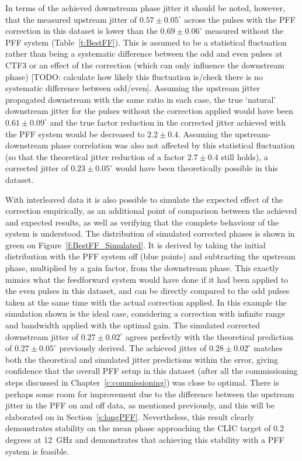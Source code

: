 In terms of the achieved downstream phase jitter it should be noted, however, that the measured upstream jitter of \(0.57\pm0.05^\circ\) across the pulses with the PFF correction in this dataset is lower than the \(0.69\pm0.06^\circ\) measured without the PFF system (Table~\ref{t:BestFF}). This is assumed to be a statistical fluctuation rather than being a systematic difference between the odd and even pulses at CTF3 or an effect of the correction (which can only influence the downstream phase) [TODO: calculate how likely this fluctuation is/check there is no systematic difference between odd/even]. Assuming the upstream jitter propagated downstream with the same ratio in each case, the true `natural' downstream jitter for the pulses without the correction applied would have been \(0.61\pm0.09^\circ\) and the true factor reduction in the corrected jitter achieved with the PFF system would be decreased to \(2.2\pm0.4\). Assuming the upstream-downstream phase correlation was also not affected by this statistical fluctuation (so that the theoretical jitter reduction of a factor \(2.7\pm0.4\) still holds), a corrected jitter of \(0.23\pm0.05^\circ\) would have been theoretically possible in this dataset.

With interleaved data it is also possible to simulate the expected effect of the correction empirically, as an additional point of comparison between the achieved and expected results, as well as verifying that the complete behaviour of the system is understood. The distribution of simulated corrected phases is shown in green on Figure~\ref{f:BestFF_Simulated}. It is derived by taking the initial distribution with the PFF system off (blue points) and subtracting the upstream phase, multiplied by a gain factor, from the downstream phase. This exactly mimics what the feedforward system would have done if it had been applied to the even pulses in this dataset, and can be directly compared to the odd pulses taken at the same time with the actual correction applied. In this example the simulation shown is the ideal case, considering a correction with infinite range and bandwidth applied with the optimal gain. The simulated corrected downstream jitter of \(0.27\pm0.02^\circ\) agrees perfectly with the theoretical prediction of \(0.27\pm0.05^\circ\) previously derived. The achieved jitter of \(0.28\pm0.02^\circ\) matches both the theoretical and simulated jitter predictions within the error, giving confidence that the overall PFF setup in this dataset (after all the commissioning steps discussed in Chapter~\ref{c:commissioning}) was close to optimal. There is perhaps some room for improvement due to the difference between the upstream jitter in the PFF on and off data, as mentioned previously, and this will be elaborated on in Section~\ref{s:longPFF}. Nevertheless, this result clearly demonstrates stability on the mean phase approaching the CLIC target of 0.2 degrees at 12~GHz and demonstrates that achieving this stability with a PFF system is feasible.



